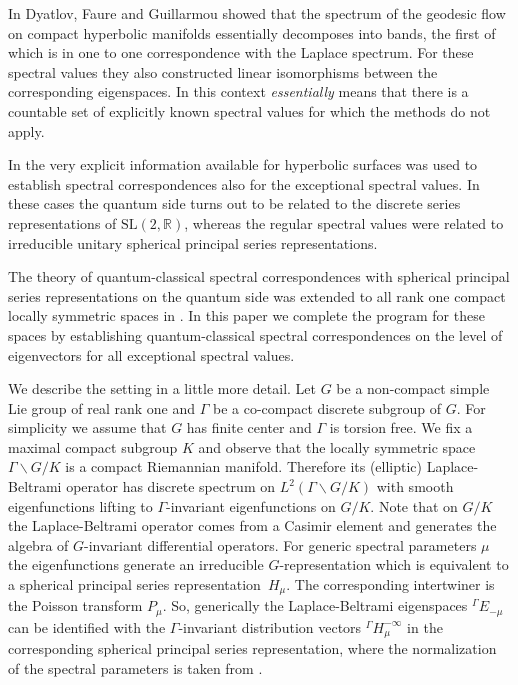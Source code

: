 \documentclass[JEP,XML,SOM,NoFloatCountersInSection,Unicode,published]{cedram}
\newcommand{\Ga}{{}^\Gamma\!}
\theoremstyle{definition}
\newcommand{\R}{\ensuremath{\mathbb{R}}}
\newcommand{\pstd}[1]{\ensuremath{H_{#1}^{-\infty}}}
\begin{document}
In \cite{DFG} Dyatlov, Faure and Guillarmou showed that the spectrum of the geodesic flow on compact hyperbolic manifolds essentially decomposes into bands, the first of which is in one to one correspondence with the Laplace spectrum. For these spectral values they also constructed linear isomorphisms between the corresponding eigenspaces. In this context \emph{essentially} means that there is a countable set of explicitly known spectral values for which the methods do not apply.

In \cite{GHWa} the very explicit information available for hyperbolic surfaces was used to establish spectral correspondences also for the exceptional spectral values. In these cases the quantum side turns out to be related to the discrete series representations of $\mathrm{SL}(2,\R)$, whereas the regular spectral values were related to irreducible unitary spherical principal series representations.

The theory of quantum-classical spectral correspondences with spherical principal series representations on the quantum side was extended to all rank one compact locally symmetric spaces in \cite{GHWb}. In this paper we complete the program for these spaces by establishing quantum-classical spectral correspondences on the level of eigenvectors for all exceptional spectral values.

We describe the setting in a little more detail. Let $G$ be a non-compact simple Lie group of real rank one and $\Gamma$ be a co-compact discrete subgroup of $G$. For simplicity we assume that $G$ has finite center and $\Gamma$ is torsion free. We fix a maximal compact subgroup $K$ and observe that the locally symmetric space $\Gamma\backslash G/K$ is a compact Riemannian manifold. Therefore its (elliptic) Laplace-Beltrami operator has discrete spectrum on $L^2(\Gamma\backslash G/K)$ with smooth eigenfunctions lifting to $\Gamma$\nobreakdash-invariant eigenfunctions on $G/K$. Note that on $G/K$ the Laplace-Beltrami operator comes from a Casimir element and generates the algebra of $G$-invariant differential operators. For generic spectral parameters $\mu$ the eigenfunctions generate an irreducible $G$-representation which is equivalent to a spherical principal series \hbox{representation}~$H_\mu$. The \hbox{corresponding} \hbox{intertwiner} is the Poisson transform $P_\mu$. So, generically the Laplace-Beltrami eigenspaces $\Ga E_{-\mu}$ can be identified with the $\Gamma$\nobreakdash-invari\-ant distribution vectors $\Ga \pstd{\mu}$ in the corresponding spherical principal series representation, where the normalization of the spectral para\-me\-ters is taken from \cite{GHWb}.
\end{document}
